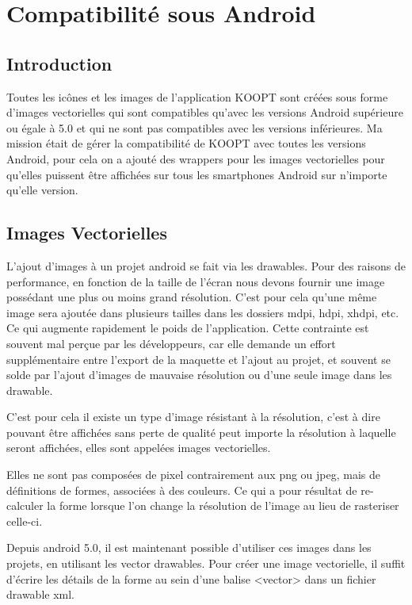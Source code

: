 \chapter{Compatibilité sous Android}
\label{sec:Compatibilité sous Android}

\section*{Introduction}

Toutes les icônes et les images de l’application KOOPT sont créées sous forme d'images vectorielles qui sont compatibles qu’avec les versions Android supérieure ou égale à 5.0 et qui ne sont pas compatibles avec les versions inférieures.
Ma mission était de gérer la compatibilité de KOOPT avec toutes les versions Android, pour cela on a ajouté des wrappers pour les images vectorielles pour qu’elles puissent être affichées sur tous les smartphones Android sur n’importe qu’elle version.


\section{Images Vectorielles}

L’ajout d’images à un projet android se fait via les drawables. Pour des raisons de performance, en fonction de la taille de l’écran nous devons fournir une image possédant une plus ou moins grand résolution. C’est pour cela qu’une même image sera ajoutée dans plusieurs tailles dans les dossiers mdpi, hdpi, xhdpi, etc. Ce qui augmente rapidement le poids de l’application.
Cette contrainte est souvent mal perçue par les développeurs, car elle demande un effort supplémentaire entre l’export de la maquette et l’ajout au projet, et souvent se solde par l’ajout d’images de mauvaise résolution ou d’une seule image dans les drawable.
 
C’est pour cela il existe un type d’image résistant à la résolution, c’est à dire pouvant être affichées sans perte de qualité peut importe la résolution à laquelle seront affichées, elles sont appelées images vectorielles.

Elles ne sont pas composées de pixel contrairement aux png ou jpeg, mais de définitions de formes, associées à des couleurs. Ce qui a pour résultat de re-calculer la forme lorsque l’on change la résolution de l’image au lieu de rasteriser celle-ci.

Depuis android 5.0, il est maintenant possible d’utiliser ces images dans les projets, en utilisant les vector drawables.
Pour créer une image vectorielle, il suffit d’écrire les détails de la forme au sein d’une balise <vector> dans un fichier drawable xml.\cite{imagevectorielle}

